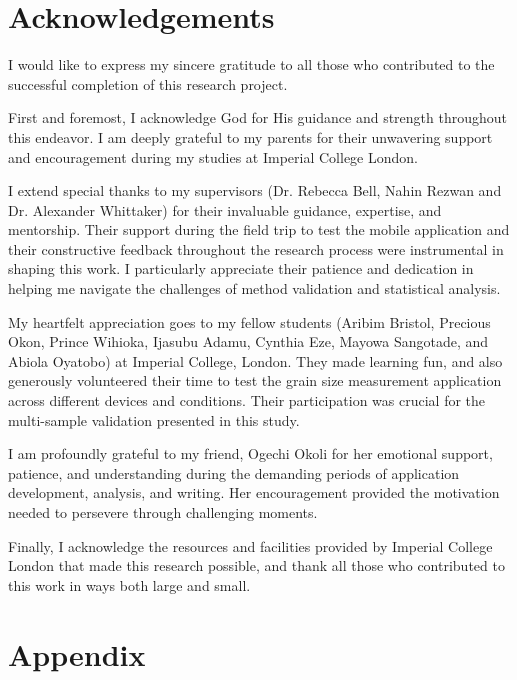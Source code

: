 \documentclass[final-report]{report-template}
\begin{document}
\newpage
\section{Acknowledgements}
I would like to express my sincere gratitude to all those who contributed to the successful completion of this research project.

First and foremost, I acknowledge God for His guidance and strength throughout this endeavor. I am deeply grateful to my parents for their unwavering support and encouragement during my studies at Imperial College London.

I extend special thanks to my supervisors (Dr. Rebecca Bell, Nahin Rezwan and Dr. Alexander Whittaker) for their invaluable guidance, expertise, and mentorship. Their support during the field trip to test the mobile application and their constructive feedback throughout the research process were instrumental in shaping this work. I particularly appreciate their patience and dedication in helping me navigate the challenges of method validation and statistical analysis.

My heartfelt appreciation goes to my fellow students (Aribim Bristol, Precious Okon, Prince Wihioka, Ijasubu Adamu, Cynthia Eze, Mayowa Sangotade, and Abiola Oyatobo) at Imperial College, London. They made learning fun, and also generously volunteered their time to test the grain size measurement application across different devices and conditions. Their participation was crucial for the multi-sample validation presented in this study.

I am profoundly grateful to my friend, Ogechi Okoli for her emotional support, patience, and understanding during the demanding periods of application development, analysis, and writing. Her encouragement provided the motivation needed to persevere through challenging moments.

Finally, I acknowledge the resources and facilities provided by Imperial College London that made this research possible, and thank all those who contributed to this work in ways both large and small.
\newpage


\newpage
\appendix
\section{Appendix}
\end{document}
